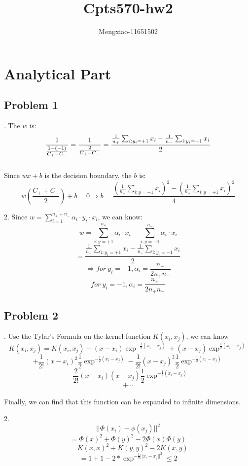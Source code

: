\documentclass[12pt]{article}
\author{Mengxiao-11651502}
\title{Cpts570-hw2}
\begin{document}
    \maketitle
    \pagebreak
    \section{Analytical Part}
        \subsection{Problem 1}
            \par{}. The $w$ is:
                $$\frac{1}{\frac{1-(-1)}{C_+-C_-}}\\
                = \frac{1}{\frac{2}{C_+-C_-}}
                = \frac{\frac{1}{n_+}\sum_{i:y_i=+1}x_i-\frac{1}{n_-}\sum_{i:y_i=-1}x_i}{2}$$ \\
                 Since $wx+b$ is the decision boundary, the $b$ is:
                $$w(\frac{C_++C_-}{2})+b=0
                \Rightarrow b=\frac{(\frac{1}{n_-}\sum_{i:y=-1}x_i)^2-(\frac{1}{n_+}\sum_{i:y=+1}x_i)^2}{4}$$
            \par 2. Since $w=\sum_{i=1}^{n_++n_-}\alpha_i\cdot y_i\cdot x_i$, we can know:
                \[w=\sum_{i:y=+1}^{n_+}\alpha_i\cdot x_i -\sum_{i:y=-1}^{n_-}\alpha_i\cdot x_i\]
                \[=\frac{\frac{1}{n_+}\sum_{i:y_i=+1}x_i-\frac{1}{n_-}\sum_{i:y_i=-1}x_i}{2}\]
                \[\Rightarrow for\ y_i=+1,\alpha_i=\frac{n_-}{2n_+n_-}\]
                \[for\ y_i=-1,\alpha_i=\frac{n_+}{2n_+n_-}\]
        \subsection{Problem 2}
            \par{}. Use the Tylar's Formula on the kernel function $K(x_i,x_j)$, we can know
            \[K(x_i,x_j)=K(x_i,x_j)-(x-x_i)\exp^{-\frac{1}{2}(x_i-x_j)}+(x-x_j)\exp^{\frac{1}{2}(x_i-x_j)}\]
            \[+\frac{1}{2!}(x-x_i)^2\frac{1}{2}\exp^{-\frac{1}{2}(x_i-x_j)}-\frac{1}{2!}(x-x_j)^2\frac{1}{2}\exp^{-\frac{1}{2}(x_i-x_j)}\]
            \[-\frac{2}{2!}(x-x_i)(x-x_j)\frac{1}{2}\exp^{-\frac{1}{2}(x_i-x_j)}\]
            \[+\cdots\]
            \\ Finally, we can find that this function can be expanded to infinite dimensions.
            \par 2. \[||\Phi(x_i)-\phi(x_j)||^2\]
            \[=\Phi(x)^2+\Phi(y)^2-2\Phi(x)\Phi(y)\]
            \[=K(x,x)^2+K(y,y)^2-2K(x,y)\]
            \[=1+1-2*\exp^{-\frac{1}{2}||x_i-x_j||^2}\le 2\]
\end{document}
